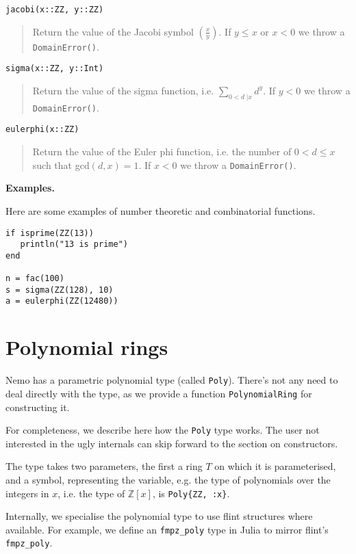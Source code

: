 \documentclass[a4paper,10pt]{article}
\newcommand{\Z}{\mathbb{Z}}
\newcommand{\code}{\lstinline}
\newcommand{\desc}[1]{\vspace{-3mm}\begin{quote}#1\end{quote}}
\newcommand{\ljk}[2]{\left(\frac{#1}{#2}\right)}
\begin{document}
{{{{{{\begin{lstlisting}
jacobi(x::ZZ, y::ZZ)
\end{lstlisting}

\desc{Return the value of the Jacobi symbol $\ljk{x}{y}$. If $y \leq x$ or $x < 0$ we
throw a \code{DomainError()}.}

\begin{lstlisting}
sigma(x::ZZ, y::Int)
\end{lstlisting}

\desc{Return the value of the sigma function, i.e. $\sum_{0 < d \;| x} d^y$. If $y < 0$
we throw a \code{DomainError()}.}

\begin{lstlisting}
eulerphi(x::ZZ)
\end{lstlisting}

\desc{Return the value of the Euler phi function, i.e. the number of $0 < d \leq x$ such
that gcd$(d, x) = 1$. If $x < 0$ we throw a \code{DomainError()}.}

\textbf{Examples.}

Here are some examples of number theoretic and combinatorial functions.

\begin{lstlisting}
if isprime(ZZ(13))
   println("13 is prime")
end

n = fac(100)
s = sigma(ZZ(128), 10)
a = eulerphi(ZZ(12480))
\end{lstlisting}

\section{Polynomial rings}

Nemo has a parametric polynomial type (called \code{Poly}). There's not any need to deal
directly with the type, as we provide a function \code{PolynomialRing} for constructing
it.

For completeness, we describe here how the \code{Poly} type works. The user not interested
in the ugly internals can skip forward to the section on constructors.

The type takes two parameters, the first a ring $T$ on which it is parameterised, and a
symbol, representing the variable, e.g. the type of polynomials over the integers in $x$, 
i.e. the type of $\Z[x]$, is \code|Poly{ZZ, :x}|.

Internally, we specialise the polynomial type to use flint structures where available.
For example, we define an \code{fmpz_poly} type in Julia to mirror flint's \code{fmpz_poly}.

}}}}}}
\end{document}
